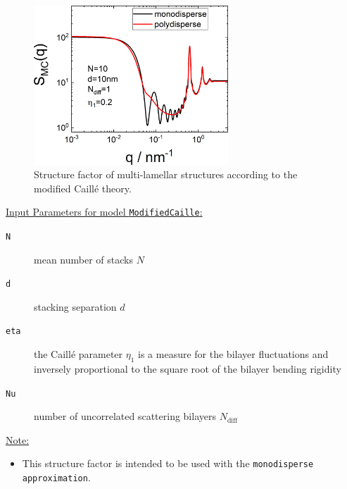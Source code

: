 \begin{figure}[htb]
\begin{center}
\includegraphics[width=0.65\textwidth]{../images/structure_factor/Lamellar/MCLamellar.png}
\end{center}
\caption{Structure factor of multi-lamellar structures according to the modified Caill\'e theory.}
\label{fig:MCLamellar}
\end{figure}

\vspace{5mm}

\noindent
\underline{Input Parameters for model \texttt{ModifiedCaille}:}
\begin{description}
\item[\texttt{N}] mean number of stacks $N$
\item[\texttt{d}] stacking separation $d$
\item[\texttt{eta}]  the Caill\'e parameter $\eta_1$ is a measure for the bilayer
fluctuations and inversely proportional to the square root of
the bilayer bending rigidity
\item[\texttt{Nu}]   number of uncorrelated scattering bilayers $N_\text{diff}$
\end{description}

\noindent\underline{Note:}
\begin{itemize}
\item This structure factor is intended to be used with the \texttt{monodisperse approximation}.
\end{itemize}

\clearpage
